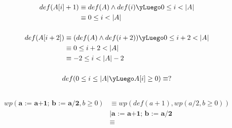 \documentclass[fleqn,10pt,a4paper]{article}
\begin{document}
\subsubsection{}%

\begin{align*}
def(A[i] + 1) &\equiv def(A) \land def(i) \yLuego 0 \leq i < |A|\\
              &\equiv 0 \leq i < |A|
\end{align*}

\subsubsection{}%

\begin{align*}
def(A[i + 2]) &\equiv (def(A) \land def(i+2)) \yLuego 0 \leq i+2 < |A| \\
              &\equiv 0 \leq i+2 < |A| \\
              &\equiv -2 \leq i < |A|-2
\end{align*}

\subsubsection{}%

\begin{align*}
def(0 \leq i \leq |A| \yLuego A[i] \geq 0) &\equiv ? \\
\end{align*}

\subsection{}%
\subsubsection{}%

\begin{align*}
wp(\textbf{a := a+1; b := a/2}, b \geq 0) &\equiv wp(def(a+1),wp(a/2, b\geq 0))\\
                                &|\textbf{a := a+1; b := a/2}\\
                                          &\equiv 
\end{align*}

\subsubsection{}%
\end{document}
